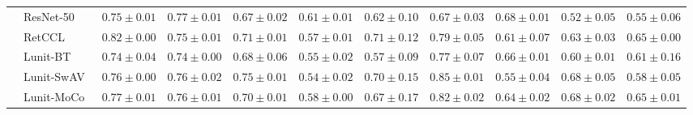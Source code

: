 \begin{tabular}{ll|cccc|c|cccc}
 & ResNet-50~\cite{he2015deep} & $0.75 \pm 0.01$ & $\mathbf{0.77 \pm 0.01}$ & $0.67 \pm 0.02$ & $0.61 \pm 0.01$ & $0.62 \pm 0.10$ & $0.67 \pm 0.03$ & $\mathbf{0.68 \pm 0.01}$ & $0.52 \pm 0.05$ & $0.55 \pm 0.06$ \\
 & RetCCL~\cite{wang2023retccl} & $0.82 \pm 0.00$ & $0.75 \pm 0.01$ & $0.71 \pm 0.01$ & $0.57 \pm 0.01$ & $0.71 \pm 0.12$ & $0.79 \pm 0.05$ & $0.61 \pm 0.07$ & $0.63 \pm 0.03$ & $0.65 \pm 0.00$ \\
 & Lunit-BT~\cite{kang2023benchmarking} & $0.74 \pm 0.04$ & $0.74 \pm 0.00$ & $0.68 \pm 0.06$ & $0.55 \pm 0.02$ & $0.57 \pm 0.09$ & $0.77 \pm 0.07$ & $0.66 \pm 0.01$ & $0.60 \pm 0.01$ & $0.61 \pm 0.16$ \\
 & Lunit-SwAV~\cite{kang2023benchmarking} & $0.76 \pm 0.00$ & $0.76 \pm 0.02$ & $0.75 \pm 0.01$ & $0.54 \pm 0.02$ & $0.70 \pm 0.15$ & $0.85 \pm 0.01$ & $0.55 \pm 0.04$ & $0.68 \pm 0.05$ & $0.58 \pm 0.05$ \\
 & Lunit-MoCo~\cite{kang2023benchmarking} & $0.77 \pm 0.01$ & $0.76 \pm 0.01$ & $0.70 \pm 0.01$ & $0.58 \pm 0.00$ & $0.67 \pm 0.17$ & $0.82 \pm 0.02$ & $0.64 \pm 0.02$ & $0.68 \pm 0.02$ & $0.65 \pm 0.01$ \\
\cline{1-11}
\bottomrule
\end{tabular}
